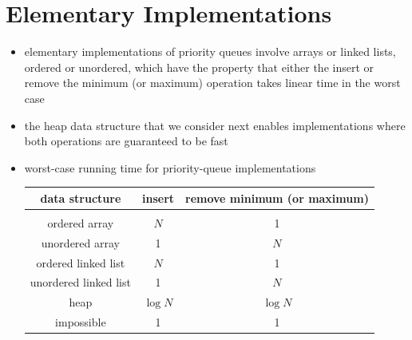 \documentclass[8pt,a4paper,compress]{beamer}
\begin{document}
\section{Elementary Implementations}
\begin{frame}[fragile]
\begin{itemize}
\item elementary implementations of priority queues involve arrays or linked lists, ordered or unordered, which have the property that either the insert or remove the minimum (or maximum) operation takes linear time in the worst case

\item the heap data structure that we consider next enables implementations where both operations are guaranteed to be fast

\item worst-case running time for priority-queue implementations
\begin{center}
\begin{tabular}{ccc}
\textbf{data structure} & \textbf{insert} & \textbf{remove minimum (or maximum)} \\ \hline \\
ordered array & $N$ & 1 \\
unordered array & 1 & $N$ \\
ordered linked list & $N$ & 1 \\
unordered linked list & 1 & $N$ \\
heap & $\log N$ & $\log N$ \\
impossible & 1 & 1
\end{tabular} 
\end{center}
\end{itemize}
\end{frame}
\end{document}
